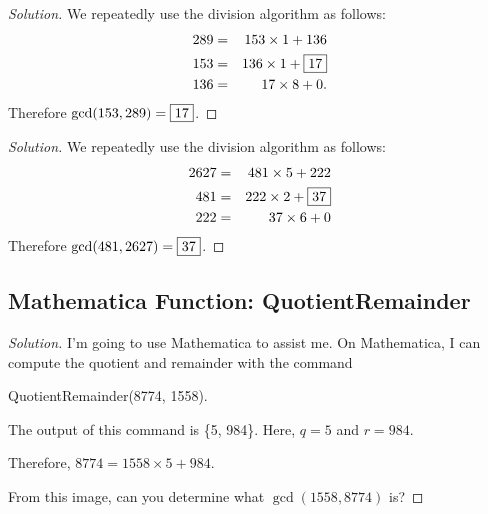 \begin{proof}[Solution]
	We repeatedly use the division algorithm as follows:
		\begin{eqnarray*}  289 &=& 153\times 1+136 \\ 153 &=& 136\times 1+\framebox{17} \\ 136&=& 17\times 8+0. \end{eqnarray*}
Therefore $\gcd(153, 289)=\framebox{17}$.  \end{proof}

\clearpage


\begin{proof}[Solution]
We repeatedly use the division algorithm as follows: 
	\begin{eqnarray*}  
	2627 &=& 481\times 5+222 \\
	481 &=& 222\times 2+\framebox{37} \\
	222 &=& 37\times 6+0 
	\end{eqnarray*}
Therefore $\gcd(481, 2627)=\framebox{37}$. 
\end{proof}

\clearpage

\subsection{Mathematica Function: QuotientRemainder}


\begin{proof}[Solution]
	
I'm going to use Mathematica to assist me. On Mathematica, I can compute the quotient and remainder with the command \begin{center} QuotientRemainder(8774, 1558). \end{center}

The output of this command is \{5, 984\}. Here, $q=5$ and $r=984$.  

Therefore, $8774=1558\times 5+984.$

\clearpage

From this image, can you determine what $\gcd(1558, 8774)$ is? \end{proof}

